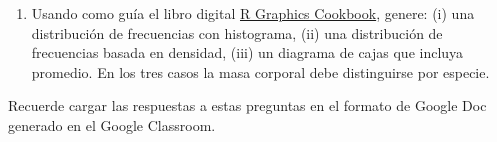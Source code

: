 \documentclass[
  letterpaper,
  DIV=11,
  numbers=noendperiod]{scrartcl}
\providecommand{\tightlist}{%
  \setlength{\itemsep}{0pt}\setlength{\parskip}{0pt}}\usepackage{longtable,booktabs,array}
\begin{document}
\begin{enumerate}
\def\labelenumi{\arabic{enumi}.}
\setcounter{enumi}{11}
\tightlist
\item
  Usando como guía el libro digital
  \href{https://r-graphics.org/index.html}{R Graphics Cookbook}, genere:
  (i) una distribución de frecuencias con histograma, (ii) una
  distribución de frecuencias basada en densidad, (iii) un diagrama de
  cajas que incluya promedio. En los tres casos la masa corporal debe
  distinguirse por especie.
\end{enumerate}

Recuerde cargar las respuestas a estas preguntas en el formato de Google
Doc generado en el Google Classroom.
\end{document}

